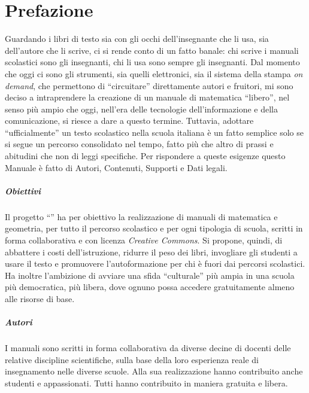 
\pagestyle{matc3page}
\chapter*{Prefazione}
Guardando i libri di testo sia con gli occhi dell'insegnante che li usa, sia dell'autore che li scrive, ci si rende conto di un fatto banale: chi scrive i manuali scolastici sono gli insegnanti, chi li usa sono sempre gli insegnanti. Dal momento che oggi ci sono gli strumenti, sia quelli elettronici, sia il sistema della stampa \textit{on demand}, che permettono di ``circuitare'' direttamente autori e fruitori, mi sono deciso a intraprendere la creazione di un manuale di matematica ``libero'', nel senso più ampio che oggi, nell'era delle tecnologie dell'informazione e della comunicazione, si riesce a dare a questo termine. Tuttavia, adottare ``ufficialmente'' un testo scolastico nella scuola italiana è un fatto semplice solo se si segue un percorso consolidato nel tempo, fatto più che altro di prassi e abitudini che non di leggi specifiche. Per rispondere a queste esigenze questo Manuale è fatto di Autori, Contenuti, Supporti e Dati legali.

\paragraph{Obiettivi} Il progetto ``\serie{}'' ha per obiettivo la realizzazione di manuali di matematica e geometria, per tutto il percorso scolastico e per ogni tipologia di scuola, scritti in forma collaborativa e con licenza \textit{Creative Commons}. Si propone, quindi, di abbattere i costi dell'istruzione, ridurre il peso dei libri, invogliare gli studenti a usare il testo e promuovere l'autoformazione per chi è fuori dai percorsi scolastici. Ha inoltre l'ambizione di avviare una sfida ``culturale'' più ampia in una scuola più democratica, più libera, dove ognuno possa accedere gratuitamente almeno alle risorse di base.

\paragraph{Autori} I manuali sono scritti in forma collaborativa da diverse decine di docenti delle relative discipline scientifiche, sulla base della loro esperienza reale di insegnamento nelle diverse scuole. Alla sua realizzazione hanno contribuito anche studenti e appassionati. Tutti hanno contribuito in maniera gratuita e libera.

